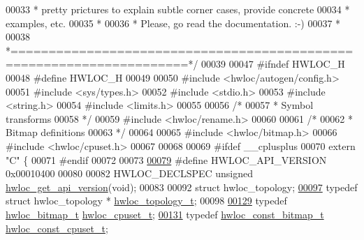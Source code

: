 \begin{DoxyCode}
00033 \textcolor{comment}{ * pretty prictures to explain subtle corner cases, provide concrete}
00034 \textcolor{comment}{ * examples, etc.}
00035 \textcolor{comment}{ *}
00036 \textcolor{comment}{ * Please, go read the documentation.  :-)}
00037 \textcolor{comment}{ *}
00038 \textcolor{comment}{ *=====================================================================*/}
00039 
00047 \textcolor{preprocessor}{#ifndef HWLOC\_H}
00048 \textcolor{preprocessor}{}\textcolor{preprocessor}{#define HWLOC\_H}
00049 \textcolor{preprocessor}{}
00050 \textcolor{preprocessor}{#include <hwloc/autogen/config.h>}
00051 \textcolor{preprocessor}{#include <sys/types.h>}
00052 \textcolor{preprocessor}{#include <stdio.h>}
00053 \textcolor{preprocessor}{#include <string.h>}
00054 \textcolor{preprocessor}{#include <limits.h>}
00055 
00056 \textcolor{comment}{/*}
00057 \textcolor{comment}{ * Symbol transforms}
00058 \textcolor{comment}{ */}
00059 \textcolor{preprocessor}{#include <hwloc/rename.h>}
00060 
00061 \textcolor{comment}{/*}
00062 \textcolor{comment}{ * Bitmap definitions}
00063 \textcolor{comment}{ */}
00064 
00065 \textcolor{preprocessor}{#include <hwloc/bitmap.h>}
00066 \textcolor{preprocessor}{#include <hwloc/cpuset.h>}
00067 
00068 
00069 \textcolor{preprocessor}{#ifdef \_\_cplusplus}
00070 \textcolor{preprocessor}{}\textcolor{keyword}{extern} \textcolor{stringliteral}{"C"} \{
00071 \textcolor{preprocessor}{#endif}
00072 \textcolor{preprocessor}{}
00073 
\hypertarget{a00033_source_l00079}{}\hyperlink{a00038_ga8f4dfb8eef138af55dd1a0fa802e5476}{00079} \textcolor{preprocessor}{#define HWLOC\_API\_VERSION 0x00010400}
00080 \textcolor{preprocessor}{}
00082 HWLOC\_DECLSPEC \textcolor{keywordtype}{unsigned} \hyperlink{a00038_ga61ef7566efe550d314b0ce4f3421ec5d}{hwloc_get_api_version}(\textcolor{keywordtype}{void});
00083 
00092 \textcolor{keyword}{struct }hwloc\_topology;
\hypertarget{a00033_source_l00097}{}\hyperlink{a00039_ga9d1e76ee15a7dee158b786c30b6a6e38}{00097} \textcolor{keyword}{typedef} \textcolor{keyword}{struct }hwloc\_topology * \hyperlink{a00039_ga9d1e76ee15a7dee158b786c30b6a6e38}{hwloc_topology_t};
00098 
\hypertarget{a00033_source_l00129}{}\hyperlink{a00040_ga4bbf39b68b6f568fb92739e7c0ea7801}{00129} \textcolor{keyword}{typedef} \hyperlink{a00065_gaa3c2bf4c776d603dcebbb61b0c923d84}{hwloc_bitmap_t} \hyperlink{a00040_ga4bbf39b68b6f568fb92739e7c0ea7801}{hwloc_cpuset_t};
\hypertarget{a00033_source_l00131}{}\hyperlink{a00040_ga1f784433e9b606261f62d1134f6a3b25}{00131} \textcolor{keyword}{typedef} \hyperlink{a00065_ga2fb1bbc8aea1ea22dee2f0fd39659f48}{hwloc_const_bitmap_t} \hyperlink{a00040_ga1f784433e9b606261f62d1134f6a3b25}{hwloc_const_cpuset_t};

\end{DoxyCode}
